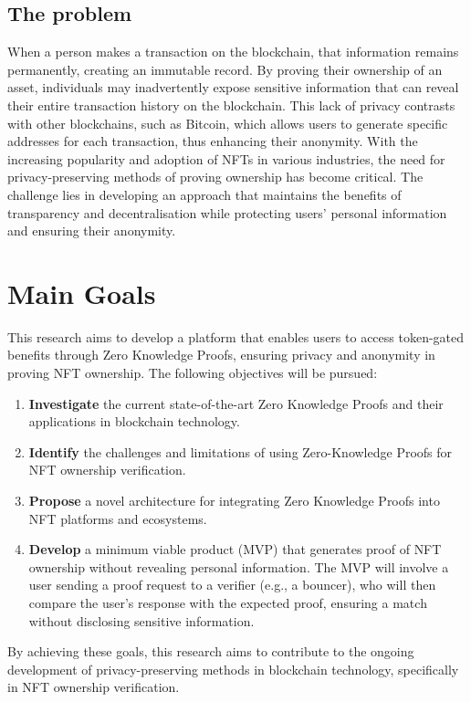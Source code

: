 \subsection{The problem}
When a person makes a transaction on the blockchain, that information remains permanently, creating an immutable record. By proving their ownership of an asset, individuals may inadvertently expose sensitive information that can reveal their entire transaction history on the blockchain. This lack of privacy contrasts with other blockchains, such as Bitcoin, which allows users to generate specific addresses for each transaction, thus enhancing their anonymity. With the increasing popularity and adoption of \ac{NFT}s in various industries, the need for privacy-preserving methods of proving ownership has become critical. The challenge lies in developing an approach that maintains the benefits of transparency and decentralisation while protecting users' personal information and ensuring their anonymity.

\section{Main Goals}
This research aims to develop a platform that enables users to access token-gated benefits through Zero Knowledge Proofs, ensuring privacy and anonymity in proving \ac{NFT} ownership. The following objectives will be pursued:

\begin{enumerate}
\item \textbf{Investigate} the current state-of-the-art Zero Knowledge Proofs and their applications in blockchain technology.
\item \textbf{Identify} the challenges and limitations of using Zero-Knowledge Proofs for \ac{NFT} ownership verification.
\item \textbf{Propose} a novel architecture for integrating Zero Knowledge Proofs into \ac{NFT} platforms and ecosystems.
\item \textbf{Develop} a minimum viable product (MVP) that generates proof of \ac{NFT} ownership without revealing personal information. The MVP will involve a user sending a proof request to a verifier (e.g., a bouncer), who will then compare the user's response with the expected proof, ensuring a match without disclosing sensitive information.
\end{enumerate}

By achieving these goals, this research aims to contribute to the ongoing development of privacy-preserving methods in blockchain technology, specifically in \ac{NFT} ownership verification.

